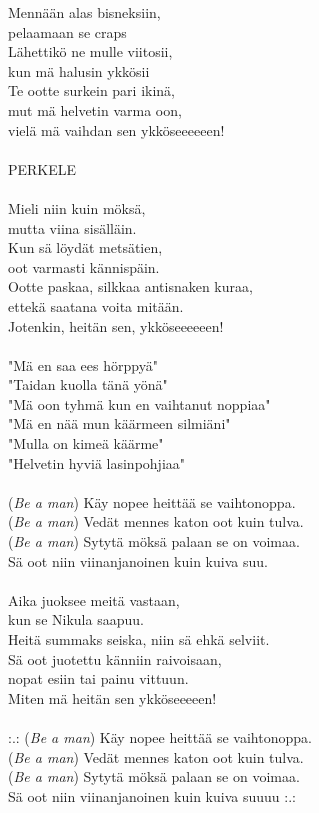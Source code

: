 
Mennään alas bisneksiin, \\
pelaamaan se craps \\
Lähettikö ne mulle viitosii, \\
kun mä halusin ykkösii \\
Te ootte surkein pari ikinä, \\
mut mä helvetin varma oon, \\
vielä mä vaihdan sen ykköseeeeeen! \\
\hspace{10mm} \\
PERKELE \\
\hspace{10mm} \\
Mieli niin kuin möksä, \\
mutta viina sisälläin. \\
Kun sä löydät metsätien, \\
oot varmasti kännispäin. \\
Ootte paskaa, silkkaa antisnaken kuraa, \\
ettekä saatana voita mitään. \\
Jotenkin, heitän sen, ykköseeeeeen! \\
\hspace{10mm} \\
"Mä en saa ees hörppyä" \\
"Taidan kuolla tänä yönä" \\
"Mä oon tyhmä kun en vaihtanut noppiaa" \\
"Mä en nää mun käärmeen silmiäni" \\
"Mulla on kimeä käärme" \\
"Helvetin hyviä lasinpohjiaa" \\
\hspace{10mm} \\
(\textit{Be a man}) Käy nopee heittää se vaihtonoppa. \\
(\textit{Be a man}) Vedät mennes katon oot kuin tulva. \\
(\textit{Be a man}) Sytytä möksä palaan se on voimaa. \\
Sä oot niin viinanjanoinen kuin kuiva suu. \\
\hspace{10mm} \\
Aika juoksee meitä vastaan, \\
kun se Nikula saapuu. \\
Heitä summaks seiska, niin sä ehkä selviit. \\
Sä oot juotettu känniin raivoisaan, \\
nopat esiin tai painu vittuun. \\
Miten mä heitän sen ykköseeeeen! \\
\hspace{10mm} \\
:.: (\textit{Be a man}) Käy nopee heittää se vaihtonoppa. \\
(\textit{Be a man}) Vedät mennes katon oot kuin tulva. \\
(\textit{Be a man}) Sytytä möksä palaan se on voimaa. \\
Sä oot niin viinanjanoinen kuin kuiva suuuu :.: \\
